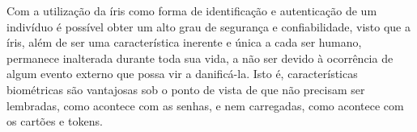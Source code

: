 \begin{citacao}
Com a utilização da íris como forma de identificação e autenticação de um indivíduo é possível obter um alto grau de segurança e confiabilidade, visto que a íris, além de ser uma característica inerente e única a cada ser humano, permanece inalterada durante toda sua vida, a não ser devido à ocorrência de algum evento externo que possa vir a danificá-la. Isto é, características biométricas são vantajosas sob o ponto de vista de que não precisam ser lembradas, como acontece com as senhas, e nem carregadas, como acontece com os cartões e tokens. \cite{priscila2007}
\end{citacao}